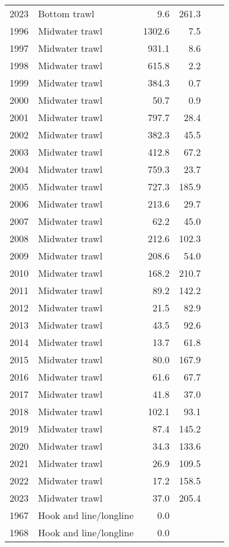 \begin{longtable}[t]{llrrrr}
2023 & Bottom trawl & 9.6 & 261.3 &  & \\
1996 & Midwater trawl & 1302.6 & 7.5 &  & \\
1997 & Midwater trawl & 931.1 & 8.6 &  & \\
1998 & Midwater trawl & 615.8 & 2.2 &  & \\
1999 & Midwater trawl & 384.3 & 0.7 &  & \\
2000 & Midwater trawl & 50.7 & 0.9 &  & \\
2001 & Midwater trawl & 797.7 & 28.4 &  & \\
2002 & Midwater trawl & 382.3 & 45.5 &  & \\
2003 & Midwater trawl & 412.8 & 67.2 &  & \\
2004 & Midwater trawl & 759.3 & 23.7 &  & \\
2005 & Midwater trawl & 727.3 & 185.9 &  & \\
2006 & Midwater trawl & 213.6 & 29.7 &  & \\
2007 & Midwater trawl & 62.2 & 45.0 &  & \\
2008 & Midwater trawl & 212.6 & 102.3 &  & \\
2009 & Midwater trawl & 208.6 & 54.0 &  & \\
2010 & Midwater trawl & 168.2 & 210.7 &  & \\
2011 & Midwater trawl & 89.2 & 142.2 &  & \\
2012 & Midwater trawl & 21.5 & 82.9 &  & \\
2013 & Midwater trawl & 43.5 & 92.6 &  & \\
2014 & Midwater trawl & 13.7 & 61.8 &  & \\
2015 & Midwater trawl & 80.0 & 167.9 &  & \\
2016 & Midwater trawl & 61.6 & 67.7 &  & \\
2017 & Midwater trawl & 41.8 & 37.0 &  & \\
2018 & Midwater trawl & 102.1 & 93.1 &  & \\
2019 & Midwater trawl & 87.4 & 145.2 &  & \\
2020 & Midwater trawl & 34.3 & 133.6 &  & \\
2021 & Midwater trawl & 26.9 & 109.5 &  & \\
2022 & Midwater trawl & 17.2 & 158.5 &  & \\
2023 & Midwater trawl & 37.0 & 205.4 &  & \\
1967 & Hook and line/longline & 0.0 &  &  & \\
1968 & Hook and line/longline & 0.0 &  &  & \\

\end{longtable}
